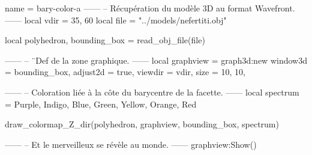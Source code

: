 \documentclass{standalone}
\begin{document}
\begin{luadraw}{name = bary-color-a}
------
-- Récupération du modèle 3D au format Wavefront.
------
local vdir = {35, 60}
local file = "../models/nefertiti.obj"

local polyhedron, bounding_box = read_obj_file(file)

------
-- ¨Def de la zone graphique.
------
local graphview = graph3d:new{
  window3d = bounding_box,
  adjust2d = true,
  viewdir  = vdir,
  size     = {10, 10},
}

------
-- Coloration liée à la côte du barycentre de la facette.
------
local spectrum = {Purple, Indigo, Blue, Green, Yellow, Orange, Red}

draw_colormap_Z_dir(polyhedron, graphview, bounding_box, spectrum)

------
-- Et le merveilleux se révèle au monde.
------
graphview:Show()
\end{luadraw}
\end{document}
